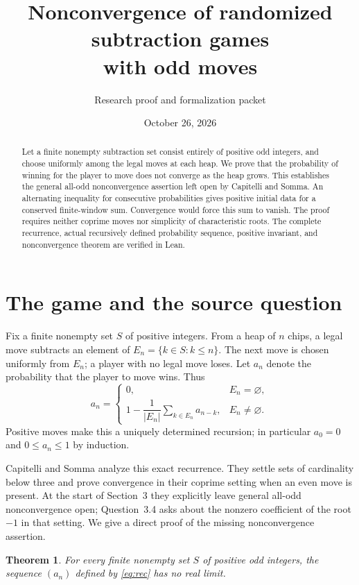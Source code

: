 \documentclass[11pt]{article}
\title{Nonconvergence of randomized subtraction games\\with odd moves}
\author{Research proof and formalization packet}
\date{October 26, 2026}
\newtheorem{theorem}{Theorem}
\begin{document}
\maketitle
\begin{abstract}
Let a finite nonempty subtraction set consist entirely of positive odd
integers, and choose uniformly among the legal moves at each heap.
We prove that the probability of winning for the player to move does not
converge as the heap grows. This establishes the general all-odd
nonconvergence assertion left open by Capitelli and Somma. An alternating
inequality for consecutive probabilities gives positive initial data for
a conserved finite-window sum. Convergence would force this sum to vanish.
The proof requires neither coprime moves nor simplicity of characteristic
roots. The complete recurrence, actual recursively defined probability
sequence, positive invariant, and nonconvergence theorem are verified in Lean.
\end{abstract}

\section{The game and the source question}
Fix a finite nonempty set $S$ of positive integers. From a heap of $n$
chips, a legal move subtracts an element of
$E_n=\{k\in S:k\leq n\}$. The next move is chosen uniformly from $E_n$;
a player with no legal move loses. Let $a_n$ denote the probability that
the player to move wins. Thus
\begin{equation}\label{eq:rec}
 a_n=\begin{cases}
 0,&E_n=\varnothing,\\
 1-\dfrac{1}{|E_n|}\displaystyle\sum_{k\in E_n}a_{n-k},
       &E_n\ne\varnothing.
 \end{cases}
\end{equation}
Positive moves make this a uniquely determined recursion; in particular
$a_0=0$ and $0\leq a_n\leq1$ by induction.

Capitelli and Somma \cite{CS} analyze this exact recurrence. They settle
sets of cardinality below three and prove convergence in their coprime
setting when an even move is present. At the start of Section~3 they
explicitly leave general all-odd nonconvergence open; Question~3.4 asks
about the nonzero coefficient of the root $-1$ in that setting. We give a
direct proof of the missing nonconvergence assertion.

\begin{theorem}\label{thm:main}
For every finite nonempty set $S$ of positive odd integers, the sequence
$(a_n)$ defined by \eqref{eq:rec} has no real limit.
\end{theorem}
\end{document}
